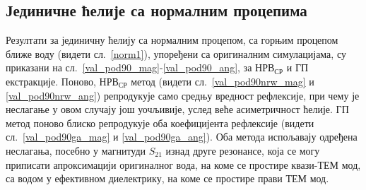 \subsection{Јединичне ћелије са нормалним процепима}
Резултати за јединичну ћелију са нормалним процепом, са горњим процепом ближе воду (видети сл.~\ref{norm1}), упоређени са оригиналним симулацијама, су приказани на сл.~\ref{val_pod90_mag}-\ref{val_pod90_ang}, за $НРВ_{СР}$ и ГП екстракције. Поново, $НРВ_{СР}$ метод (видети сл.~\ref{val_pod90nrw_mag} и \ref{val_pod90nrw_ang}) репродукује само средњу вредност рефлексије, при чему је неслагање у овом случају још уочљивије, услед веће асиметричност ћелије. ГП метод поново блиско репродукује оба коефицијента рефлексије (видети сл.~\ref{val_pod90ga_mag} и \ref{val_pod90ga_ang}). Оба метода испољавају одређена неслагања, посебно у магнитуди $S_{21}$ изнад друге резонансе, која се могу приписати апроксимацији оригиналног вода, на коме се простире квази-ТЕМ мод, са водом у ефективном диелектрику, на коме се простире прави ТЕМ мод.
